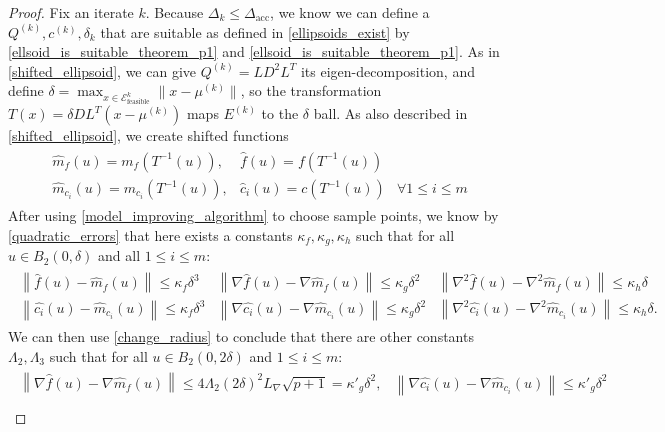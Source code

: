 \documentclass{article}
\theoremstyle{case}
\newcommand{\ck}{{c^{(k)}}}
\newcommand{\dacc}{{\Delta_{\text{acc}}}}
\newcommand{\dk}{\Delta_k}
\newcommand{\lipgrad}{{L_{\nabla}}}
\newcommand{\qk}{{Q^{(k)}}}
\newcommand{\sdk}{{\delta_k}}
\newcommand{\unshiftedellipsoid}{{\mathcal E^k_{\text{feasible}}}}
\begin{document}
\begin{proof}
Fix an iterate $k$.
Because $\dk \le \dacc$, we know we can define a $\qk, \ck, \sdk$ that are suitable as defined in \cref{ellipsoids_exist}
by \cref{ellsoid_is_suitable_theorem_p1} and \cref{ellsoid_is_suitable_theorem_p1}.
As in \cref{shifted_ellipsoid}, we can give $\qk = LD^2L^T$ its eigen-decomposition, and define $\delta = \max_{x \in \unshiftedellipsoid} \|x - \mu^{(k)}\|$, 
so the transformation $T(x) = \delta D L^T(x - \mu^{(k)})$ maps $E^{(k)}$ to the $\delta$ ball.
As also described in \cref{shifted_ellipsoid}, we  create shifted functions
\begin{align*}
\begin{array}{ccc}
\hat {m}_f(u) = m_f(T^{-1}(u)),&  \hat f (u) = f(T^{-1}(u)) &\\
\hat {m}_{c_i}(u) = m_{c_i}(T^{-1}(u)), &  \hat c_i (u) = c(T^{-1}(u))& \forall 1 \le i \le m
\end{array}
\end{align*}
After using \cref{model_improving_algorithm} to choose sample points, we know by \cref{quadratic_errors} that
here exists a constants $\kappa_f, \kappa_g, \kappa_h$ such that for all $u \in B_2(0, \delta)$ and all $1\le i\le m$:
\begin{align*}
\begin{array}{ccc}
\left\| \hat {f}\left(u\right) -  \hat{m}_f\left(u\right) \right\|\le \kappa_f \delta^3 &
\left\|\nabla \hat {f}\left(u\right) - \nabla \hat{m}_f\left(u\right) \right\|\le \kappa_g \delta^2 &
\left\|\nabla^2 \hat {f}\left(u\right) - \nabla^2 \hat{m}_f\left(u\right) \right\|\le \kappa_h \delta \\
\left\| \hat {{c_i}}\left(u\right) -  \hat{m}_{c_i}\left(u\right) \right\|\le \kappa_f \delta^3 &
\left\|\nabla \hat {{c_i}}\left(u\right) - \nabla \hat{m}_{c_i}\left(u\right) \right\|\le \kappa_g \delta^2 &
\left\|\nabla^2 \hat {{c_i}}\left(u\right) - \nabla^2 \hat{m}_{c_i}\left(u\right) \right\|\le \kappa_h \delta.
\end{array}
\end{align*}
We can then use \cref{change_radius} to conclude that there are other constants $\Lambda_2, \Lambda_3$ such that for all $u \in B_2(0, 2\delta)$ and $1\le i\le m$:
\begin{align*}
\begin{array}{cc}
\left\|\nabla \hat {f}\left(u\right) - \nabla \hat{m}_f\left(u\right) \right\|\le 4 \Lambda_2 \left(2\delta\right)^2 \lipgrad \sqrt{p+1} = {\kappa'}_g\delta^2, &
\left\|\nabla \hat {c_i}\left(u\right) - \nabla \hat{m}_{c_i}\left(u\right) \right\|\le {\kappa'}_g\delta^2 \\

\end{array}
\end{align*}
\end{proof}
\end{document}

